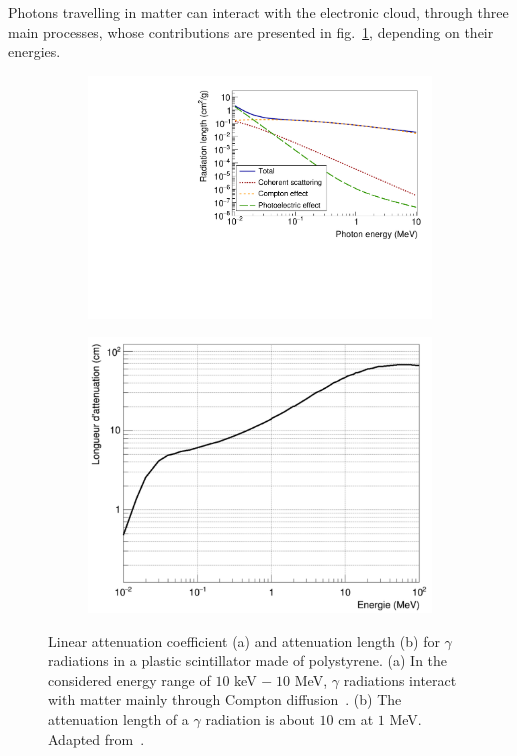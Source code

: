 Photons travelling in  matter can interact with the electronic cloud, through three main processes, whose contributions are presented in fig.~\ref{subfig:photon_energy_loss}, depending on their energies.
\begin{figure}[h]
  \centering
  \begin{subfigure}[t]{0.48\textwidth}
    \centering
    \includegraphics[width=1\textwidth]{commissioning/fig_commissioning/photon_energy_loss.pdf}
    \captionsetup{justification=centering}
    \caption{\label{subfig:photon_energy_loss}}
  \end{subfigure}
  \hfill
  \begin{subfigure}[t]{0.48\textwidth}
    \centering
    \includegraphics[width=1\textwidth]{commissioning/fig_commissioning/attenuation_length_photons.pdf}
    \captionsetup{justification=centering}
    \caption{\label{subfig:attenuation_length_photons}}
  \end{subfigure}
  \caption{Linear attenuation coefficient (a) and attenuation length (b) for $\gamma$ radiations in a plastic scintillator made of polystyrene.
    (a) In the considered energy range of $10$ keV $ -\; 10$ MeV, $\gamma$ radiations interact with matter mainly through Compton diffusion~\cite{web:nist_Xcom}.
    (b) The attenuation length of a $\gamma$ radiation is about $10$ cm at $1$ MeV.
    Adapted from~\cite{HuberThesis}.
  }
\end{figure}

